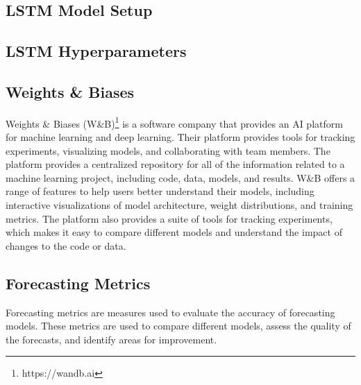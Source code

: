   \subsection{LSTM Model Setup}

  \subsection{LSTM Hyperparameters}
  \label{sec:lstm-hyperparameters-evaluation-setup}


  \subsection{Weights \& Biases}
  \label{sec:wandb-evaluation-setup}
    
    Weights \& Biases (W\&B)\footnote{https://wandb.ai} is a software company that provides an AI platform for machine learning and deep learning. Their platform provides tools for tracking experiments, visualizing models, and collaborating with team members.
    The platform provides a centralized repository for all of the information related to a machine learning project, including code, data, models, and results.
    W\&B offers a range of features to help users better understand their models, including interactive visualizations of model architecture, weight distributions, and training metrics. The platform also provides a suite of tools for tracking experiments, which makes it easy to compare different models and understand the impact of changes to the code or data.



  
  \subsection{Forecasting Metrics}
  \label{sec:forecasting-metrics-evaluation-setup}

    Forecasting metrics \cite{botchkarevPerformanceMetricsError2018} are measures used to evaluate the accuracy of forecasting models. These metrics are used to compare different models, assess the quality of the forecasts, and identify areas for improvement.

